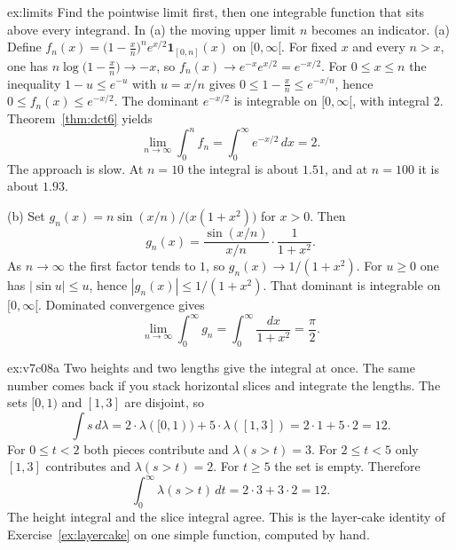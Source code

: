 \begin{solution}{ex:limits}
\idea Find the pointwise limit first, then one integrable function that sits above every integrand. In (a) the moving upper limit \(n\) becomes an indicator.
\writeup (a) Define \(f_n(x)=\bigl(1-\frac xn\bigr)^ne^{x/2}\mathbf 1_{[0,n]}(x)\) on \([0,\infty[\). For fixed \(x\) and every \(n>x\), one has \(n\log\bigl(1-\frac xn\bigr)\to-x\), so \(f_n(x)\to e^{-x}e^{x/2}=e^{-x/2}\). For \(0\le x\le n\) the inequality \(1-u\le e^{-u}\) with \(u=x/n\) gives \(0\le1-\frac xn\le e^{-x/n}\), hence \(0\le f_n(x)\le e^{-x/2}\). The dominant \(e^{-x/2}\) is integrable on \([0,\infty[\), with integral \(2\). Theorem~\ref{thm:dct6} yields
\[
\lim_{n\to\infty}\int_0^nf_n=\int_0^\infty e^{-x/2}\,dx=2.
\]
The approach is slow. At \(n=10\) the integral is about \(1.51\), and at \(n=100\) it is about \(1.93\).

(b) Set \(g_n(x)=n\sin(x/n)/\bigl(x(1+x^2)\bigr)\) for \(x>0\). Then
\[
g_n(x)=\frac{\sin(x/n)}{x/n}\cdot\frac1{1+x^2}.
\]
As \(n\to\infty\) the first factor tends to \(1\), so \(g_n(x)\to1/(1+x^2)\). For \(u\ge0\) one has \(|\sin u|\le u\), hence \(|g_n(x)|\le1/(1+x^2)\). That dominant is integrable on \([0,\infty[\). Dominated convergence gives
\[
\lim_{n\to\infty}\int_0^\infty g_n=\int_0^\infty\frac{dx}{1+x^2}=\frac\pi2.
\]
\end{solution}

\begin{solution}{ex:v7c08a}
\idea Two heights and two lengths give the integral at once. The same number comes back if you stack horizontal slices and integrate the lengths.
\writeup The sets \([0,1)\) and \([1,3]\) are disjoint, so
\[
\int s\,d\lambda=2\cdot\lambda([0,1))+5\cdot\lambda([1,3])=2\cdot1+5\cdot2=12.
\]
For \(0\le t<2\) both pieces contribute and \(\lambda(s>t)=3\). For \(2\le t<5\) only \([1,3]\) contributes and \(\lambda(s>t)=2\). For \(t\ge5\) the set is empty. Therefore
\[
\int_0^\infty\lambda(s>t)\,dt=2\cdot3+3\cdot2=12.
\]
The height integral and the slice integral agree. This is the layer-cake identity of Exercise~\ref{ex:layercake} on one simple function, computed by hand.
\end{solution}

